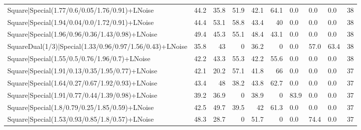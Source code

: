 \begin{tabular}{lrrrrrlllr}
 Square|Special(1.77/0.6/0.05/1.76/0.91)+LNoise                  &            44.2 &            35.8 &            51.9 &            42.1 &           64.1 & 0.0             & 0.0            & 0.0            &           38 \\
 Square|Special(1.94/0.04/0.0/1.72/0.91)+LNoise                  &            44.4 &            53.1 &            58.8 &            43.4 &           40   & 0.0             & 0.0            & 0.0            &           38 \\
 Square|Special(1.96/0.96/0.36/1.43/0.98)+LNoise                 &            49.4 &            45.3 &            55.1 &            48.4 &           43.1 & 0.0             & 0.0            & 0.0            &           38 \\
 SquareDual(1/3)|Special(1.33/0.96/0.97/1.56/0.43)+LNoise        &            35.8 &            43   &             0   &            36.2 &            0   & 0.0             & 57.0           & 63.4           &           38 \\
 Square|Special(1.55/0.5/0.76/1.96/0.7)+LNoise                   &            42.2 &            43.3 &            55.3 &            42.2 &           55.6 & 0.0             & 0.0            & 0.0            &           38 \\
 Square|Special(1.91/0.13/0.35/1.95/0.77)+LNoise                 &            42.1 &            20.2 &            57.1 &            41.8 &           66   & 0.0             & 0.0            & 0.0            &           37 \\
 Square|Special(1.64/0.27/0.67/1.92/0.93)+LNoise                 &            43.4 &            48   &            38.2 &            43.8 &           62.7 & 0.0             & 0.0            & 0.0            &           37 \\
 Square|Special(1.91/0.77/0.44/1.39/0.98)+LNoise                 &            39.2 &            36.9 &             0   &            38.9 &            0   & 83.9            & 0.0            & 0.0            &           37 \\
 Square|Special(1.8/0.79/0.25/1.85/0.59)+LNoise                  &            42.5 &            49.7 &            39.5 &            42   &           61.3 & 0.0             & 0.0            & 0.0            &           37 \\
 Square|Special(1.53/0.93/0.85/1.8/0.57)+LNoise                  &            48.3 &            28.7 &             0   &            51.7 &            0   & 0.0             & 74.4           & 0.0            &           37 \\

\end{tabular}
